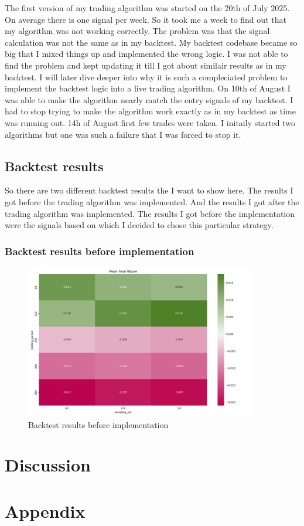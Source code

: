 \documentclass[12pt]{article}
\begin{document}
The first version of my trading algorithm was started on the 20th of July 2025. On average there is one signal per week. So it took me a week to find out that my algorithm was not working correctly. The problem was that the signal calculation was not the same as in my backtest. My backtest codebase became so big that I mixed things up and implemented the wrong logic.
I was not able to find the problem and kept updating it till I got about similair results as in my backtest. I will later dive deeper into why it is such a compleciated problem to implement the backtest logic into a live trading algorithm.
On 10th of August I was able to make the algorithm nearly match the entry signals of my backtest. I had to stop trying to make the algorithm work exactly as in my backtest as time was running out. 14h of August first few trades were taken. 
I initaily started two algorithms but one was such a failure that I was forced to stop it.









\subsection{Backtest results}
So there are two different backtest results the I want to show here. The results I got before the trading algorithm was implemented. And the results I got after the trading algorithm was implemented.
The results I got before the implementation were the signals based on which I decided to chose this particular strategy.

\subsubsection*{Backtest results before implementation}


\begin{figure}[h]
    \centering
    \includegraphics[width=0.9\textwidth]{imgs/backtest_results_ma.png}
    \caption{Backtest results before implementation}
    \label{fig:backtest_results_before_implementation}
\end{figure}


\newpage


\newpage




\newpage
\section{Discussion}


\newpage
\section{Appendix}
\end{document}
